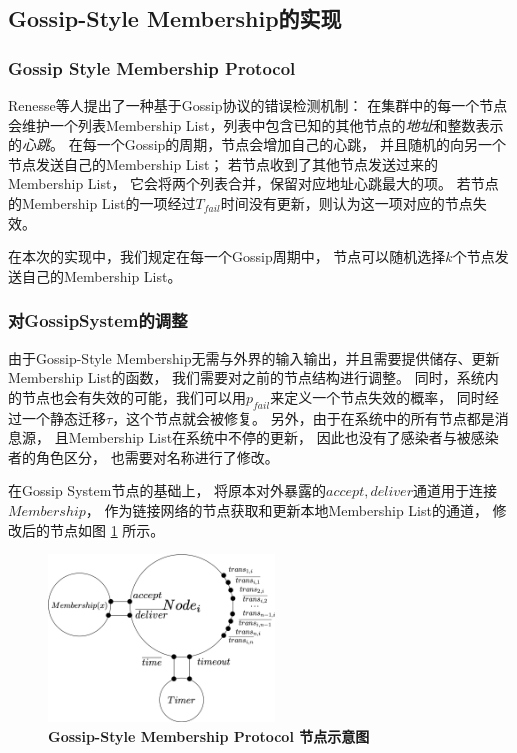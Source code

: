 \subsection{Gossip-Style Membership的实现}

\subsubsection{Gossip Style Membership Protocol}
Renesse等人提出了一种基于Gossip协议的错误检测机制：
在集群中的每一个节点会维护一个列表Membership List，列表中包含已知的其他节点的\textit{地址}和整数表示的\textit{心跳}。
在每一个Gossip的周期，节点会增加自己的心跳，
并且随机的向另一个节点发送自己的Membership List；
若节点收到了其他节点发送过来的Membership List，
它会将两个列表合并，保留对应地址心跳最大的项。
若节点的Membership List的一项经过$T_{fail}$时间没有更新，则认为这一项对应的节点失效。

在本次的实现中，我们规定在每一个Gossip周期中，
节点可以随机选择$k$个节点发送自己的Membership List。

\subsubsection{对GossipSystem的调整}
由于Gossip-Style Membership无需与外界的输入输出，并且需要提供储存、更新Membership List的函数，
我们需要对之前的节点结构进行调整。
同时，系统内的节点也会有失效的可能，我们可以用$p_{fail}$来定义一个节点失效的概率，
同时经过一个静态迁移$\tau$，这个节点就会被修复。
另外，由于在系统中的所有节点都是消息源，
且Membership List在系统中不停的更新，
因此也没有了感染者与被感染者的角色区分，
也需要对名称进行了修改。

在Gossip System节点的基础上，
将原本对外暴露的$accept,deliver$通道用于连接$Membership$，
作为链接网络的节点获取和更新本地Membership List的通道，
修改后的节点如图
\ref{fig_membership_node}
所示。

\begin{figure}[!htbp]
	\small
	\centering
	\includegraphics[width=6cm]{../figure/Node.png}
    \caption{\textbf{Gossip-Style Membership Protocol 节点示意图}}
    \label{fig_membership_node}
\end{figure}

